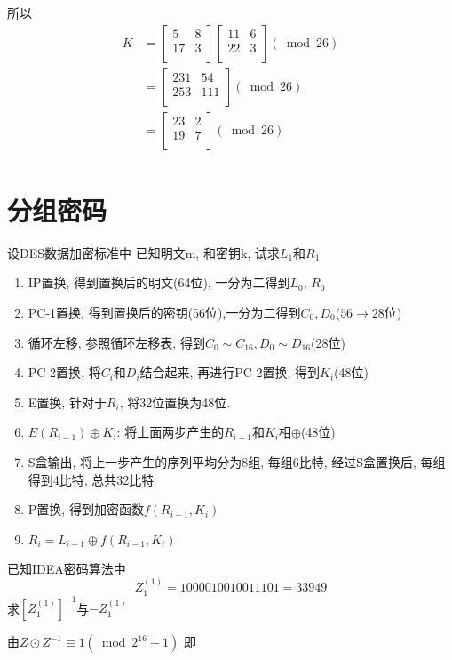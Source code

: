 \documentclass[UTF8]{ctexart}
\begin{document}
\begin{enumerate}[label={[}\arabic*{]}]
  所以
  $$
  \begin{aligned}
    K&=\left[ \begin{matrix} 5 &8\\ 17 &3\\ \end{matrix}\right]\left[ \begin{matrix} 11 &6\\ 22 &3\\ \end{matrix}\right](\bmod 26)\\
      &=\left[ \begin{matrix} 231 &54\\ 253 &111\\ \end{matrix}\right](\bmod 26)\\
      &=\left[ \begin{matrix} 23 &2\\ 19 &7\\ \end{matrix}\right](\bmod 26)\\
  \end{aligned}
  $$
\end{enumerate}

\section{分组密码}
\begin{enumerate}[label={[}\arabic*{]}]
  \item 设DES数据加密标准中
  已知明文m, 和密钥k, 试求$L_1$和$R_1$

  \begin{enumerate}
    \item IP置换, 得到置换后的明文(64位), 一分为二得到$L_0$, $R_0$
    \item PC-1置换, 得到置换后的密钥(56位),一分为二得到$C_0, D_0$($56\rightarrow28$位)
    \item 循环左移, 参照循环左移表, 得到$C_0\sim C_{16}, D_0\sim D_{16}$(28位)
    \item PC-2置换, 将$C_i$和$D_i$结合起来, 再进行PC-2置换, 得到$K_i$(48位)
    \item E置换, 针对于$R_i$, 将32位置换为48位.
    \item $E(R_{i-1})\oplus K_i$: 将上面两步产生的$R_{i-1}$和$K_i$相$\oplus$(48位)
    \item S盒输出, 将上一步产生的序列平均分为8组, 每组6比特, 经过S盒置换后, 每组得到4比特, 总共32比特
    \item P置换, 得到加密函数$f(R_{i-1}, K_i)$
    \item $R_i=L_{i-1}\oplus f(R_{i-1}, K_i)$
  \end{enumerate}

  \item 已知IDEA密码算法中
  $$Z_1^{(1)}=1000010010011101=33949$$
  求$[Z_1^{(1)}]^{-1}$与$-Z_1^{(1)}$

  由$Z\odot Z^{-1}\equiv 1(\bmod 2^{16}+1)$
  即
\end{enumerate}
\end{document}
